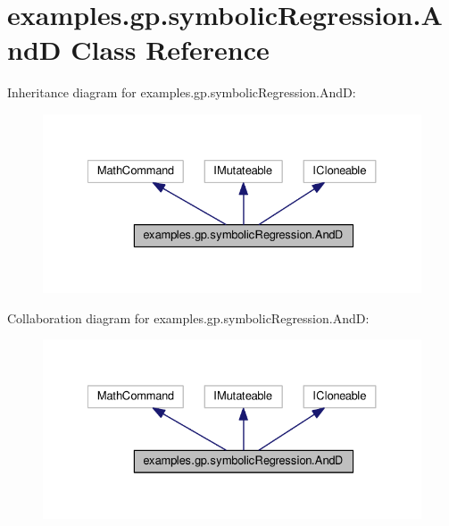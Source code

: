 \hypertarget{classexamples_1_1gp_1_1symbolic_regression_1_1_and_d}{\section{examples.\-gp.\-symbolic\-Regression.\-And\-D Class Reference}
\label{classexamples_1_1gp_1_1symbolic_regression_1_1_and_d}
}


Inheritance diagram for examples.\-gp.\-symbolic\-Regression.\-And\-D\-:
\nopagebreak
\begin{figure}[H]
\begin{center}
\leavevmode
\includegraphics[width=330pt]{classexamples_1_1gp_1_1symbolic_regression_1_1_and_d__inherit__graph}
\end{center}
\end{figure}


Collaboration diagram for examples.\-gp.\-symbolic\-Regression.\-And\-D\-:
\nopagebreak
\begin{figure}[H]
\begin{center}
\leavevmode
\includegraphics[width=330pt]{classexamples_1_1gp_1_1symbolic_regression_1_1_and_d__coll__graph}
\end{center}
\end{figure}
